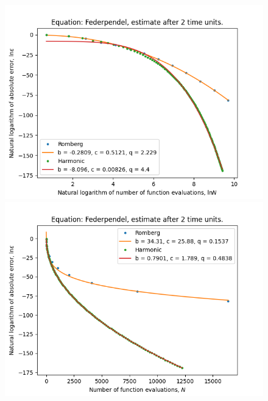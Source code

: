 \begin{figure}[H]
\centering
\begin{minipage}{0.45\textwidth}
\centering
\includegraphics[scale=0.45]{emr_plots/federpendel_2_hp_log_log_pow_fit_trend.png}
\end{minipage}
\begin{minipage}{0.45\textwidth}
\centering
\includegraphics[scale=0.45]{emr_plots/federpendel_2_hp_trend.png}
\end{minipage}
\end{figure}

